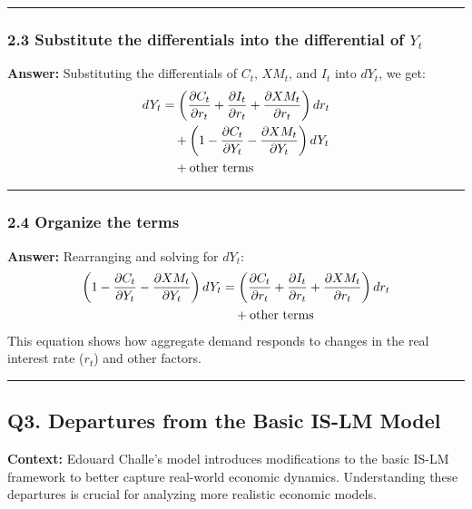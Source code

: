\documentclass{article}
\begin{document}
\noindent\rule{\linewidth}{0.5pt}

\subsubsection*{2.3 Substitute the differentials into the differential of \( Y_t \)}

\textbf{Answer:}
Substituting the differentials of \( C_t \), \( XM_t \), and \( I_t \) into \( dY_t \), we get:
\begin{align*}
    dY_t &= \left( \frac{\partial C_t}{\partial r_t} + \frac{\partial I_t}{\partial r_t} + \frac{\partial XM_t}{\partial r_t} \right) dr_t \notag \\
    &\quad + \left( 1 - \frac{\partial C_t}{\partial Y_t} - \frac{\partial XM_t}{\partial Y_t} \right) dY_t \notag \\
    &\quad + \text{other terms}
\end{align*}

\noindent\rule{\linewidth}{0.5pt}

\subsubsection*{2.4 Organize the terms}

\textbf{Answer:}
Rearranging and solving for \( dY_t \):
\begin{align}
    \left( 1 - \frac{\partial C_t}{\partial Y_t} - \frac{\partial XM_t}{\partial Y_t} \right) dY_t &= \left( \frac{\partial C_t}{\partial r_t} + \frac{\partial I_t}{\partial r_t} + \frac{\partial XM_t}{\partial r_t} \right) dr_t \notag \\
    &\quad + \text{other terms}
\end{align}
This equation shows how aggregate demand responds to changes in the real interest rate (\( r_t \)) and other factors.

\noindent\rule{\linewidth}{1pt}

\subsection*{Q3. Departures from the Basic IS-LM Model}

\textbf{Context:} Edouard Challe's model introduces modifications to the basic IS-LM framework to better capture real-world economic dynamics. Understanding these departures is crucial for analyzing more realistic economic models.
\end{document}
